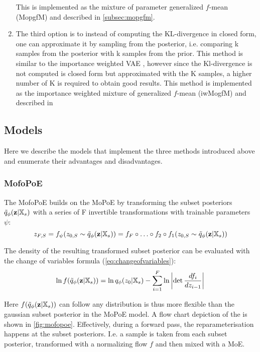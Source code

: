 \begin{enumerate}
    This is implemented as the mixture of parameter generalized $f$-mean (MopgfM) and described in \cref{subsec:mopgfm}.

    \item The third option is to instead of computing the KL-divergence in closed form, one can approximate it by sampling from the posterior, i.e. comparing k samples from the posterior with k samples from the prior.
    This method is similar to the importance weighted VAE \parencite[iwVAE]{burda_importance_2016}, however since the Kl-divergence is not computed is closed form but approximated with the K samples, a higher number of K is required to obtain good results.
    This method is implemented as the importance weighted mixture of generalized $f$-mean (iwMogfM) and described in %
\end{enumerate}

\subsection{Models}
Here we describe the models that implement the three methods introduced above and enumerate their advantages and disadvantages.

\subsubsection{MofoPoE}\label{subsec:mofopoe}
The MofoPoE builds on the MoPoE by transforming the subset posteriors $\tilde{q}_{\phi}(\textbf{z}|\mathbb{X}_s)$ with a series of F invertible transformations with trainable  parameters $\psi$:
\begin{equation}
    z_{F,S} =f_{\psi}(z_{0,S} \sim \tilde{q}_{\phi}(\textbf{z}|\mathbb{X}_s)) = f_F \circ \ldots \circ f_2 \circ f_1(z_{0,S} \sim \tilde{q}_{\phi}(\textbf{z}|\mathbb{X}_s))
\end{equation}

The density of the resulting transformed subset posterior can be evaluated with the change of variables formula (\cref{eq:changeofvariables}):
\begin{equation}
    \ln f(\tilde{q}_{\phi}(\textbf{z}|\mathbb{X}_s)) = \ln q_\phi (z_0|\mathbb{X}_s) - \sum _{i=1} ^{F}\ln \left|  \det \frac{df_i}{dz_{i-1}}\right|
\end{equation}

Here $f(\tilde{q}_{\phi}(\textbf{z}|\mathbb{X}_s))$ can follow any distribution is thus more flexible than the gaussian subset posterior in the MoPoE model.
A flow chart depiction of the  is shown in \cref{fig:mofopoe}.
Effectively, during a forward pass, the reparameterisation happens at the subset posteriors.
I.e. a sample is taken from each subset posterior, transformed with a normalizing flow $f$ and then mixed with a MoE.

